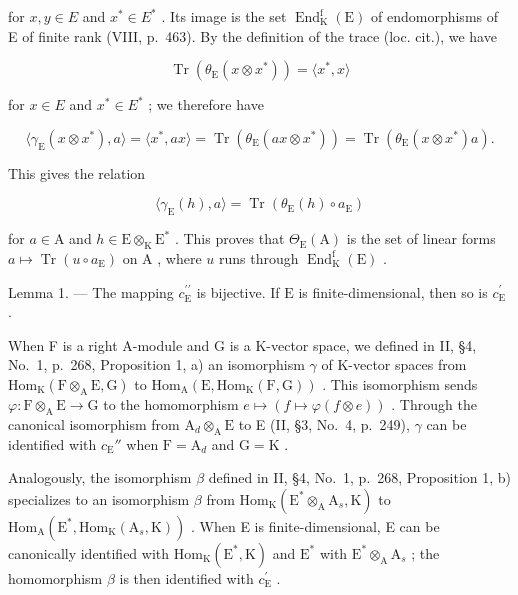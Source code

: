 for \(x, y \in E\) and \(x^{*} \in E^{*}\) . Its image is the set \(\operatorname{End}_{\mathrm{K}}^{\mathrm{f}}(\mathrm{E})\) of endomorphisms of E of finite rank (VIII, p.~463). By the definition of the trace (loc. cit.), we have

\[
\operatorname{Tr} \left(\theta_ {\mathrm{E}} \left(x \otimes x ^ {*}\right)\right) = \langle x ^ {*}, x \rangle
\]

for \(x \in E\) and \(x^{*} \in E^{*}\) ; we therefore have

\[
\langle \gamma_ {\mathrm{E}} (x \otimes x ^ {*}), a \rangle = \langle x ^ {*}, a x \rangle = \operatorname{Tr} (\theta_ {\mathrm{E}} (a x \otimes x ^ {*})) = \operatorname{Tr} (\theta_ {\mathrm{E}} (x \otimes x ^ {*}) a).
\]

This gives the relation

\[
\langle \gamma_ {\mathrm{E}} (h), a \rangle = \operatorname{Tr} (\theta_ {\mathrm{E}} (h) \circ a _ {\mathrm{E}})
\]

for \(a \in \mathrm{A}\) and \(h \in \mathrm{E} \otimes_{\mathrm{K}} \mathrm{E}^*\) . This proves that \(\Theta_{\mathrm{E}}(\mathrm{A})\) is the set of linear forms \(a \mapsto \operatorname{Tr}(u \circ a_{\mathrm{E}})\) on \(\mathrm{A}\) , where \(u\) runs through \(\operatorname{End}_{\mathrm{K}}^{\mathrm{f}}(\mathrm{E})\) .

Lemma 1. --- The mapping \(c_{\mathrm{E}}^{\prime \prime}\) is bijective. If \(\mathrm{E}\) is finite-dimensional, then so is \(c_{\mathrm{E}}^{\prime}\) .

When F is a right A-module and G is a K-vector space, we defined in II, §4, No.~1, p.~268, Proposition 1, a) an isomorphism \(\gamma\) of K-vector spaces from \(\mathrm{Hom}_{\mathrm{K}}(\mathrm{F} \otimes_{\mathrm{A}} \mathrm{E}, \mathrm{G})\) to \(\mathrm{Hom}_{\mathrm{A}}(\mathrm{E}, \mathrm{Hom}_{\mathrm{K}}(\mathrm{F}, \mathrm{G}))\) . This isomorphism sends \(\varphi : \mathrm{F} \otimes_{\mathrm{A}} \mathrm{E} \to \mathrm{G}\) to the homomorphism \(e \mapsto (f \mapsto \varphi(f \otimes e))\) . Through the canonical isomorphism from \(\mathrm{A}_d \otimes_{\mathrm{A}} \mathrm{E}\) to E (II, §3, No.~4, p.~249), \(\gamma\) can be identified with \(c_{\mathrm{E}}''\) when \(\mathrm{F} = \mathrm{A}_d\) and \(\mathrm{G} = \mathrm{K}\) .

Analogously, the isomorphism \(\beta\) defined in II, §4, No.~1, p.~268, Proposition 1, b) specializes to an isomorphism \(\beta\) from \(\mathrm{Hom}_{\mathrm{K}}(\mathrm{E}^{*}\otimes_{\mathrm{A}}\mathrm{A}_{s},\mathrm{K})\) to \(\mathrm{Hom}_{\mathrm{A}}(\mathrm{E}^{*},\mathrm{Hom}_{\mathrm{K}}(\mathrm{A}_{s},\mathrm{K}))\) . When E is finite-dimensional, E can be canonically identified with \(\mathrm{Hom}_{\mathrm{K}}(\mathrm{E}^{*},\mathrm{K})\) and \(\mathrm{E}^{*}\) with \(\mathrm{E}^{*}\otimes_{\mathrm{A}}\mathrm{A}_{s}\) ; the homomorphism \(\beta\) is then identified with \(c_{\mathrm{E}}^{\prime}\) .

